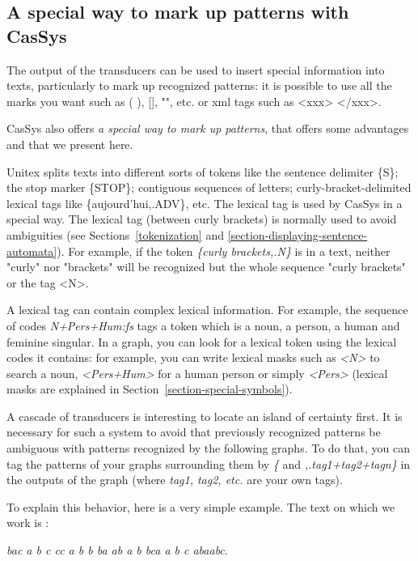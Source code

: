 \subsection{A special way to mark up patterns with CasSys}

The output of the transducers can be used to insert special information into texts, particularly to mark up recognized patterns: it is 
possible to use all the marks you want such as ( ), [], "", etc. or xml tags such as <xxx> </xxx>.

\bigskip
\noindent CasSys also offers\textit{ a special way to mark up patterns}, that offers some advantages and that we present here.  

\bigskip
\noindent Unitex splits texts into different sorts of tokens like the sentence delimiter \{S\}; the stop marker \{STOP\}; contiguous 
sequences of letters; curly-bracket-delimited lexical tags like \{aujourd'hui,.ADV\}, etc.
The lexical tag is used by CasSys in a special way. The lexical tag (between curly brackets) is normally used to avoid ambiguities (see Sections~\ref{tokenization} and \ref{section-displaying-sentence-automata}). 
For example, if the token \emph{\{curly brackets,.N\}} is in a text, neither "curly" nor "brackets" will be recognized but the whole sequence 
"curly brackets" or the tag <N>.

\bigskip
\noindent A lexical tag can contain complex lexical information. For example, the sequence of codes \emph{N+Pers+Hum:fs} tags a token which is a noun, a person, a human and feminine singular. In a graph, you can look for a lexical token using the lexical codes it contains: for example, you can write lexical masks such as \emph{<N>} to search a noun, \emph{<Pers+Hum>} for a human person or simply \emph{<Pers>} (lexical masks are explained in Section~\ref{section-special-symbols}).
 
\bigskip
\noindent A cascade of transducers is interesting to locate an island of certainty first. It is necessary for such a system to avoid that previously recognized patterns be ambiguous with patterns recognized by the following graphs. To do that, you can tag the patterns of your graphs surrounding them by \emph{\{} and \emph{,.tag1+tag2+tagn\}} in the outputs of the graph (where \emph{tag1, tag2, etc.} are your own tags).

\bigskip
\noindent To explain this behavior, here is a very simple example. The text on which we work is :

\emph{bac a b c cc a b b ba ab a b bca a b c abaabc}.

